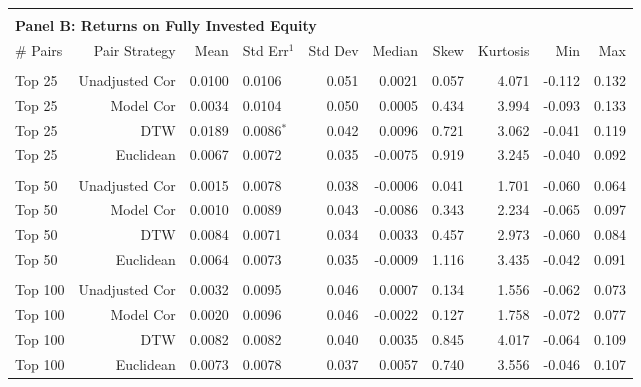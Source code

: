 \documentclass[12pt]{report}
\begin{document}
\begin{table}[hp]
\begin{tabular}{l r r l r r r r r r}
        \vspace{-1mm} \\
        \hline
        \vspace{1 mm} \\
        \multicolumn{9}{l}{\textbf{Panel B: Returns on Fully Invested Equity}} \\
        \# Pairs  & Pair Strategy & Mean & Std Err{$^{1}$} & Std Dev & Median & Skew & Kurtosis & Min & Max \\
        \hline
        \vspace{-1mm} \\
        Top 25    & Unadjusted Cor &  0.0100 & 0.0106          & 0.051 &  0.0021 &  0.057 & 4.071 & -0.112 & 0.132 \\
        Top 25    & Model Cor      &  0.0034 & 0.0104          & 0.050 &  0.0005 &  0.434 & 3.994 & -0.093 & 0.133 \\
        Top 25    & DTW            &  0.0189 & 0.0086{$^{*}$}  & 0.042 &  0.0096 &  0.721 & 3.062 & -0.041 & 0.119 \\
        Top 25    & Euclidean      &  0.0067 & 0.0072          & 0.035 & -0.0075 &  0.919 & 3.245 & -0.040 & 0.092 \\
        \vspace{-1mm} \\
        Top 50    & Unadjusted Cor &  0.0015 & 0.0078          & 0.038 & -0.0006 &  0.041 & 1.701 & -0.060 & 0.064 \\
        Top 50    & Model Cor      &  0.0010 & 0.0089          & 0.043 & -0.0086 &  0.343 & 2.234 & -0.065 & 0.097 \\
        Top 50    & DTW            &  0.0084 & 0.0071          & 0.034 &  0.0033 &  0.457 & 2.973 & -0.060 & 0.084 \\
        Top 50    & Euclidean      &  0.0064 & 0.0073          & 0.035 & -0.0009 &  1.116 & 3.435 & -0.042 & 0.091 \\
        \vspace{-1mm} \\
        Top 100   & Unadjusted Cor &  0.0032 & 0.0095          & 0.046 &  0.0007 &  0.134 & 1.556 & -0.062 & 0.073 \\
        Top 100   & Model Cor      &  0.0020 & 0.0096          & 0.046 & -0.0022 &  0.127 & 1.758 & -0.072 & 0.077 \\
        Top 100   & DTW            &  0.0082 & 0.0082          & 0.040 &  0.0035 &  0.845 & 4.017 & -0.064 & 0.109 \\
        Top 100   & Euclidean      &  0.0073 & 0.0078          & 0.037 &  0.0057 &  0.740 & 3.556 & -0.046 & 0.107 \\

\end{tabular}
\end{table}
\end{document}
